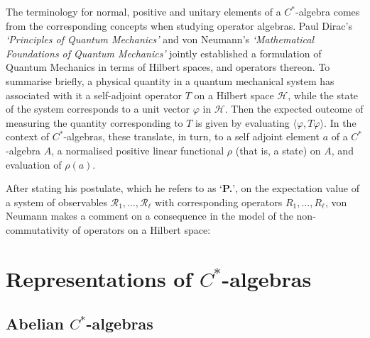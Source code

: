 \documentclass[11pt,a4paper]{report}
\theoremstyle{plain}
\theoremstyle{definition}
\newcommand{\1}{\mathbbm{1}}
\renewcommand{\H}{\mathcal{H}}
\renewcommand{\phi}{\varphi}
\begin{document}
The terminology for normal, positive and unitary elements of a $C^\ast$-algebra comes from the 
corresponding concepts when studying operator algebras. 
Paul Dirac's \emph{`Principles of Quantum Mechanics'} and von Neumann's \emph{`Mathematical Foundations 
of Quantum Mechanics'} \cite{vonneumann32} jointly established a formulation of Quantum Mechanics in terms of 
Hilbert spaces, and operators thereon. To summarise briefly, a physical quantity in a quantum mechanical 
system has associated with it a self-adjoint operator $T$ on a Hilbert space $\H$,  while the state of 
the system corresponds to a unit vector $\phi$ in $\H$. Then the expected outcome of measuring the 
quantity corresponding to $T$ is given by evaluating $\langle\phi, T\phi\rangle$. In the context of $C^
\ast$-algebras, these translate, in turn, to a self adjoint element $a$ of a $C^\ast$-algebra $A$, a 
normalised positive linear functional $\rho$ (that is, a state) on $A$, and evaluation of $\rho(a)$.

After stating his postulate, which he refers to as `\textbf{P.}', on the expectation value of a system 
of observables $\mathscr{R_1},\dots,\mathscr{R_\ell}$ with corresponding operators $R_1,\dots, R_\ell$, 
von Neumann makes a comment on a consequence in the model of the non-commutativity of operators on a 
Hilbert space:
 




\chapter{Representations of $C^\ast$-algebras}
\section{Abelian $C^\ast$-algebras}\label{section:abelian}
\end{document}
